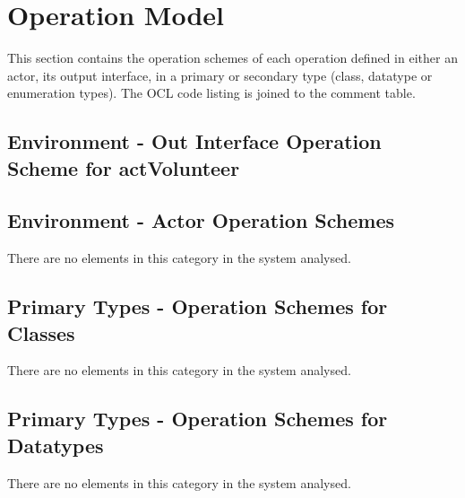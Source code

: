 \chapter{Operation Model}
\label{chap:lu.uni.lassy.excalibur.g01.specification-OM}

This section contains the operation schemes of each operation defined in either an actor, its output interface, in a primary or secondary type (class, datatype or enumeration types). 
The \msrmessir OCL code listing is joined to the comment table.

\lstset{
float,
basicstyle=\scriptsize,
language=Messir,
breakatwhitespace=false,
tabsize=2,
breaklines=true,
numbers=left,
emptylines=1,
numbersep=5pt,
showspaces=false,
showstringspaces=false,
showtabs=false
} 



		
\section{Environment - Out Interface Operation Scheme for actVolunteer}
\label{OM-EM-OutInterface-OS-actVolunteer}



\section{Environment - Actor Operation Schemes}
There are no elements in this category in the system analysed.
		


\section{Primary Types - Operation Schemes for Classes}
There are no elements in this category in the system analysed.




\section{Primary Types - Operation Schemes for Datatypes}
There are no elements in this category in the system analysed.




